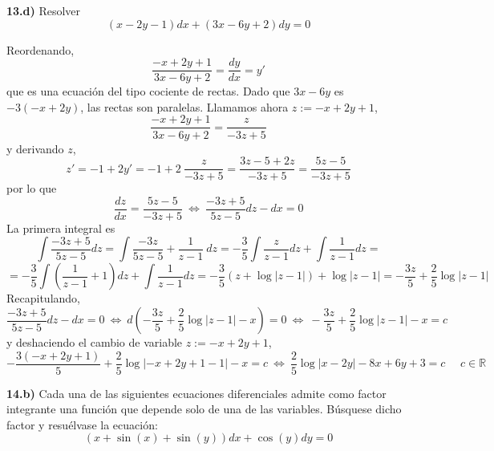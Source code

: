 \begin{ejer}
    \textbf{13.d)} Resolver
    $$(x-2y-1)dx+(3x-6y+2)dy=0$$
\end{ejer}
\begin{sol}
    Reordenando, 
    $$\dfrac{-x+2y+1}{3x-6y+2}=\dfrac{dy}{dx}=y'$$
    que es una ecuación del tipo cociente de rectas. Dado que $3x-6y$ es $-3(-x+2y)$, las rectas son paralelas. Llamamos ahora $z:=-x+2y+1$, 
    $$\dfrac{-x+2y+1}{3x-6y+2}=\dfrac{z}{-3z+5}$$
    y derivando $z$, 
    $$z'=-1+2y'=-1+2\:\dfrac{z}{-3z+5}=\dfrac{3z-5+2z}{-3z+5}=\dfrac{5z-5}{-3z+5}$$
    por lo que 
    $$\dfrac{dz}{dx}=\dfrac{5z-5}{-3z+5} \: \iff \: \dfrac{-3z+5}{5z-5}dz - dx=0$$
    La primera integral es
    $$\int \dfrac{-3z+5}{5z-5}dz =\int \dfrac{-3z}{5z-5}+\dfrac{1}{z-1} \: dz=-\dfrac{3}{5}\int\dfrac{z}{z-1}dz+\int\dfrac{1}{z-1}dz=$$
    $$=-\dfrac{3}{5}\int\left(\dfrac{1}{z-1}+1\right)dz+\int\dfrac{1}{z-1}dz=-\dfrac{3}{5}(z+\log|z-1|)+\log|z-1|=-\dfrac{3z}{5}+\dfrac{2}{5}\log|z-1|$$
    Recapitulando,
    $$\dfrac{-3z+5}{5z-5}dz - dx=0 \: \iff \: d \left( -\dfrac{3z}{5}+\dfrac{2}{5}\log|z-1| - x \right)=0 \: \iff \: -\dfrac{3z}{5}+\dfrac{2}{5}\log|z-1| - x =c$$
    y deshaciendo el cambio de variable $z:=-x+2y+1$,
    $$-\dfrac{3(-x+2y+1)}{5}+\dfrac{2}{5}\log|-x+2y+1-1| - x =c \: \iff \: \boxed{\dfrac{2}{5} \log|x - 2 y| - 8 x + 6 y + 3 = c \: } \; \; \; \;  c \in \mathbb R$$
\end{sol}
\begin{ejer}
    \textbf{14.b)} Cada una de las siguientes ecuaciones diferenciales admite como factor integrante una función que depende solo de una de las variables. Búsquese dicho factor y resuélvase la ecuación:
    $$(x+\sin(x)+\sin(y))dx+\cos(y)dy=0$$
\end{ejer}

